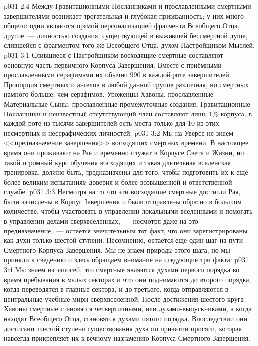 \vs p031 2:4 Между Гравитационными Посланниками и прославленными смертными завершителями возникает трогательная и глубокая привязанность; у них много общего: одни являются прямой персонализацией фрагмента Всеобщего Отца, другие~--- личностью создания, существующей в выжившей бессмертной душе, слившейся с фрагментом того же Всеобщего Отца, духом\hyp{}Настройщиком Мыслей.
\vs p031 3:1 Слившиеся с Настройщиком восходящие смертные составляют основную часть первичного Корпуса Завершения. Вместе с приёмными прославленными серафимами их обычно 990 в каждой роте завершителей. Пропорция смертных и ангелов в любой данной группе различная, но смертных намного больше, чем серафимов. Уроженцы Хавоны, прославленные Материальные Сыны, прославленные промежуточные создания, Гравитационные Посланники и неизвестный отсутствующий член составляют лишь 1\% корпуса; в каждой роте из тысячи завершителей есть места только для 10 из этих несмертных и несерафических личностей.
\vs p031 3:2 Мы на Уверсе не знаем <<предназначение завершения>> восходящих смертных времени. В настоящее время они проживают на Рае и временно служат в Корпусе Света и Жизни, но такой огромный курс обучения восходящих и такая длительная вселенская тренировка, должно быть, предназначены для того, чтобы подготовить их к ещё более великим испытаниям доверия и более возвышенной и ответственной службе.
\vs p031 3:3 \pc Несмотря на то что эти восходящие смертные достигли Рая, были зачислены в Корпус Завершения и были отправлены обратно в большом количестве, чтобы участвовать в управлении локальными вселенными и помогать в управлении делами сверхвселенных,~--- несмотря даже на это  предназначение,~--- остаётся значительным тот факт, что они зарегистрированы как духи только шестой ступени. Несомненно, остаётся ещё один шаг на пути Смертного Корпуса Завершения. Мы не знаем природы этого шага, но мы приняли к сведению и здесь обращаем внимание на следующие три факта:
\vs p031 3:4 Мы знаем из записей, что смертные являются духами первого порядка во время пребывания в малых секторах и что они поднимаются до второго порядка, когда переводятся в главные сектора, и до третьего, когда отправляются в центральные учебные миры сверхвселенной. После достижения шестого круга Хавоны смертные становятся четвертичными, или духами\hyp{}выпускниками, а когда находят Всеобщего Отца, становятся духами пятого порядка. Впоследствии они достигают шестой ступени существования духа по принятии присяги, которая навсегда прикрепляет их к вечному назначению Корпуса Смертного Завершения.
